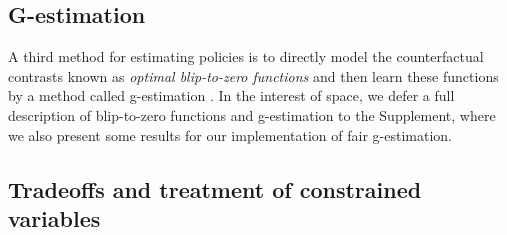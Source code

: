 \documentclass{article}
\newcommand{\red}{\textcolor{red}}
\begin{document}
\subsection{G-estimation} 
A third method for estimating policies is to directly model the counterfactual contrasts known as \emph{optimal blip-to-zero functions} and then learn these functions by a method called g-estimation \citep{robins04SNMM}.  In the interest of space, we defer a full description of blip-to-zero functions and g-estimation to the Supplement, where we also present some results for our implementation of fair g-estimation.



\subsection{Tradeoffs and treatment of constrained variables}


\end{document}
